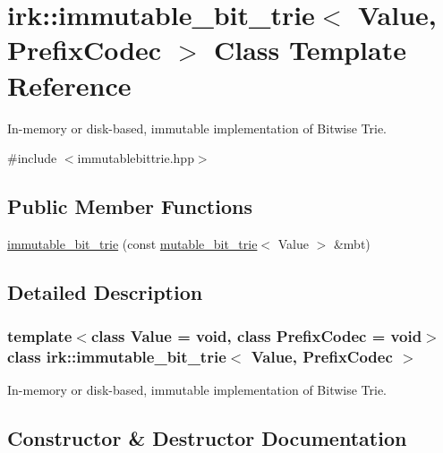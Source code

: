 \hypertarget{classirk_1_1immutable__bit__trie}{}\section{irk\+:\+:immutable\+\_\+bit\+\_\+trie$<$ Value, Prefix\+Codec $>$ Class Template Reference}
\label{classirk_1_1immutable__bit__trie}


In-\/memory or disk-\/based, immutable implementation of Bitwise Trie.  




{\ttfamily \#include $<$immutablebittrie.\+hpp$>$}

\subsection*{Public Member Functions}
\begin{DoxyCompactItemize}
\item 
\mbox{\hyperlink{classirk_1_1immutable__bit__trie_ad568fa0062761ef40916a62d26b0f91f}{immutable\+\_\+bit\+\_\+trie}} (const \mbox{\hyperlink{classirk_1_1mutable__bit__trie}{mutable\+\_\+bit\+\_\+trie}}$<$ Value $>$ \&mbt)
\end{DoxyCompactItemize}


\subsection{Detailed Description}
\subsubsection*{template$<$class Value = void, class Prefix\+Codec = void$>$\newline
class irk\+::immutable\+\_\+bit\+\_\+trie$<$ Value, Prefix\+Codec $>$}

In-\/memory or disk-\/based, immutable implementation of Bitwise Trie. 

\subsection{Constructor \& Destructor Documentation}
\mbox{\label{classirk_1_1immutable__bit__trie_ad568fa0062761ef40916a62d26b0f91f}} 
